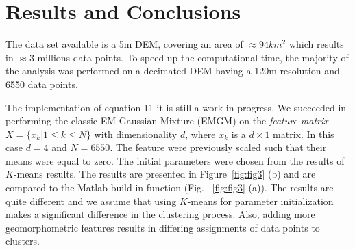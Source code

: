\documentclass[12pt,letterpaper]{article}
\begin{document}

\section{Results and Conclusions}

The data set available is a 5m DEM, covering an area of $\approx 94 km^2$ which results in $\approx 3$ millions 
data points. To speed up the computational time, the majority of the analysis was performed on a decimated 
DEM having a 120m resolution and 6550 data points. 

The implementation of equation 11 it is still a work in progress. 
We succeeded in performing the classic EM Gaussian Mixture (EMGM) on the \textit{feature matrix} 
$X = \{x_k | 1\le k \le N\}$ with dimensionality $d$,
where $x_k$ is a $d \times 1$ matrix. In this case $d=4$ and $N=6550$. 
The feature were previously scaled such that their means were equal to zero.
The initial parameters were chosen from the results of $K$-means results. The results are presented in Figure~\ref{fig:fig3} (b) and are compared to the Matlab build-in function 
(Fig. ~\ref{fig:fig3} (a)).
The results are quite different and we assume that using $K$-means for parameter initialization makes a significant difference in the clustering process.
Also, adding more geomorphometric features results in differing assignments of data points to clusters.
\end{document}
